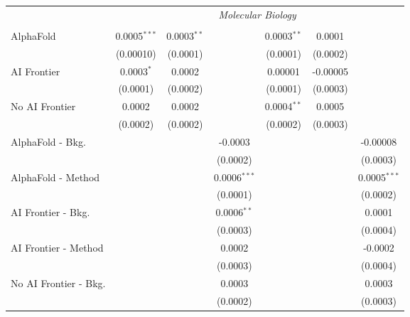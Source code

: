 \begin{tabular}{lcccccc}
 & \multicolumn{6}{c}{\textit{Molecular Biology}} \\ \\
   AlphaFold               & 0.0005$^{***}$ & 0.0003$^{**}$ &                & 0.0003$^{**}$ & 0.0001   &   \\   
                           & (0.00010)      & (0.0001)      &                & (0.0001)      & (0.0002) &   \\   
   AI Frontier             & 0.0003$^{*}$   & 0.0002        &                & 0.00001       & -0.00005 &   \\   
                           & (0.0001)       & (0.0002)      &                & (0.0001)      & (0.0003) &   \\   
   No AI Frontier          & 0.0002         & 0.0002        &                & 0.0004$^{**}$ & 0.0005   &   \\   
                           & (0.0002)       & (0.0002)      &                & (0.0002)      & (0.0003) &   \\   
   AlphaFold - Bkg.        &                &               & -0.0003        &               &          & -0.00008\\   
                           &                &               & (0.0002)       &               &          & (0.0003)\\   
   AlphaFold - Method      &                &               & 0.0006$^{***}$ &               &          & 0.0005$^{***}$\\   
                           &                &               & (0.0001)       &               &          & (0.0002)\\   
   AI Frontier - Bkg.      &                &               & 0.0006$^{**}$  &               &          & 0.0001\\   
                           &                &               & (0.0003)       &               &          & (0.0004)\\   
   AI Frontier - Method    &                &               & 0.0002         &               &          & -0.0002\\   
                           &                &               & (0.0003)       &               &          & (0.0004)\\   
   No AI Frontier - Bkg.   &                &               & 0.0003         &               &          & 0.0003\\   
                           &                &               & (0.0002)       &               &          & (0.0003)\\   

\end{tabular}
